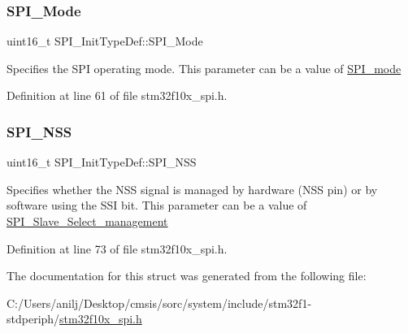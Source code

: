 \subsubsection{\texorpdfstring{S\+P\+I\+\_\+\+Mode}{SPI\_Mode}}
{\footnotesize\ttfamily uint16\+\_\+t S\+P\+I\+\_\+\+Init\+Type\+Def\+::\+S\+P\+I\+\_\+\+Mode}

Specifies the S\+PI operating mode. This parameter can be a value of \hyperlink{group___s_p_i__mode}{S\+P\+I\+\_\+mode} 

Definition at line 61 of file stm32f10x\+\_\+spi.\+h.

\mbox{\label{struct_s_p_i___init_type_def_a6c1ea4b5e3d147b74799efa42e3903c6}} 
\subsubsection{\texorpdfstring{S\+P\+I\+\_\+\+N\+SS}{SPI\_NSS}}
{\footnotesize\ttfamily uint16\+\_\+t S\+P\+I\+\_\+\+Init\+Type\+Def\+::\+S\+P\+I\+\_\+\+N\+SS}

Specifies whether the N\+SS signal is managed by hardware (N\+SS pin) or by software using the S\+SI bit. This parameter can be a value of \hyperlink{group___s_p_i___slave___select__management}{S\+P\+I\+\_\+\+Slave\+\_\+\+Select\+\_\+management} 

Definition at line 73 of file stm32f10x\+\_\+spi.\+h.



The documentation for this struct was generated from the following file\+:\begin{DoxyCompactItemize}
\item 
C\+:/\+Users/anilj/\+Desktop/cmsis/sorc/system/include/stm32f1-\/stdperiph/\hyperlink{stm32f10x__spi_8h}{stm32f10x\+\_\+spi.\+h}\end{DoxyCompactItemize}
